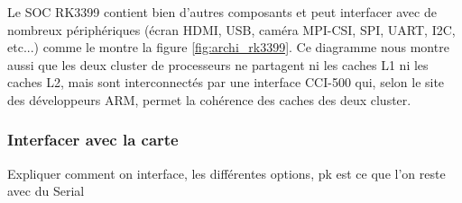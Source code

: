 Le SOC RK3399 contient bien d'autres composants et peut interfacer avec de nombreux périphériques (écran HDMI, USB, caméra MPI-CSI, SPI, UART, I2C, etc...) comme le montre la figure \ref{fig:archi_rk3399}. Ce diagramme nous montre aussi que les deux \gls{cluster} de processeurs ne partagent ni les caches L1 ni les caches L2, mais sont interconnectés par une interface CCI-500 qui, selon le site des développeurs ARM, permet la cohérence des caches des deux cluster.


\subsubsection{Interfacer avec la carte}

\begin{center}
    \color{red}
    Expliquer comment on interface, les différentes options, pk est ce que l'on reste avec du Serial
\end{center}